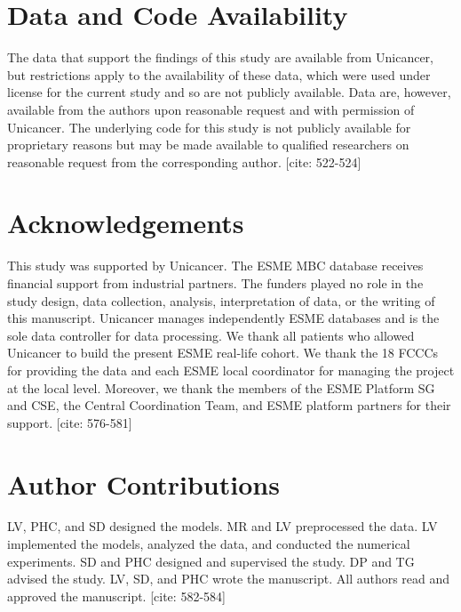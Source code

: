 \documentclass[a4paper,10pt]{article}
\begin{document}
\section{Data and Code Availability}
The data that support the findings of this study are available from Unicancer, but restrictions apply to the availability of these data, which were used under license for the current study and so are not publicly available. Data are, however, available from the authors upon reasonable request and with permission of Unicancer. The underlying code for this study is not publicly available for proprietary reasons but may be made available to qualified researchers on reasonable request from the corresponding author. [cite: 522-524]

\section{Acknowledgements}
This study was supported by Unicancer. The ESME MBC database receives financial support from industrial partners. The funders played no role in the study design, data collection, analysis, interpretation of data, or the writing of this manuscript. Unicancer manages independently ESME databases and is the sole data controller for data processing. We thank all patients who allowed Unicancer to build the present ESME real-life cohort. We thank the 18 FCCCs for providing the data and each ESME local coordinator for managing the project at the local level. Moreover, we thank the members of the ESME Platform SG and CSE, the Central Coordination Team, and ESME platform partners for their support. [cite: 576-581]

\section{Author Contributions}
LV, PHC, and SD designed the models. MR and LV preprocessed the data. LV implemented the models, analyzed the data, and conducted the numerical experiments. SD and PHC designed and supervised the study. DP and TG advised the study. LV, SD, and PHC wrote the manuscript. All authors read and approved the manuscript. [cite: 582-584]
\end{document}
